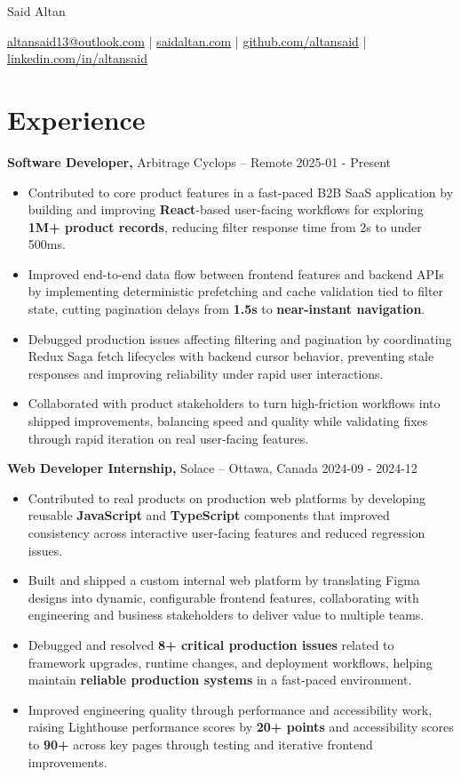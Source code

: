 \documentclass[11pt]{article}       %
\newcommand{\resumeSubheading}[4]{
\textbf{#1,} {#3} -- #4 \hfill #2 \\
\vspace{-9pt}
}
\newcommand{\resumeItem}[1]{
  \item #1
}
\begin{document}
\centerline{\Huge Said Altan}

\vspace{10pt}

\centerline{\href{mailto:altansaid13@outlook.com}{altansaid13@outlook.com} | \href{https://saidaltan.com}{saidaltan.com} | \href{https://github.com/altansaid}{github.com/altansaid} | \href{https://www.linkedin.com/in/altansaid}{linkedin.com/in/altansaid}}

\vspace{5pt}
\section*{Experience}
\resumeSubheading{Software Developer}{2025-01 - Present}{Arbitrage Cyclops}{Remote}
\begin{itemize}
  \resumeItem{Contributed to core product features in a fast-paced B2B SaaS application by building and improving \textbf{React}-based user-facing workflows for exploring \textbf{1M+ product records}, reducing filter response time from 2s to under 500ms.}
  \resumeItem{Improved end-to-end data flow between frontend features and backend APIs by implementing deterministic prefetching and cache validation tied to filter state, cutting pagination delays from \textbf{1.5s} to \textbf{near-instant navigation}.}
  \resumeItem{Debugged production issues affecting filtering and pagination by coordinating Redux Saga fetch lifecycles with backend cursor behavior, preventing stale responses and improving reliability under rapid user interactions.}
  \resumeItem{Collaborated with product stakeholders to turn high-friction workflows into shipped improvements, balancing speed and quality while validating fixes through rapid iteration on real user-facing features.}
\end{itemize}

\resumeSubheading{Web Developer Internship}{2024-09 - 2024-12}{Solace}{Ottawa, Canada}
\begin{itemize}
  \resumeItem{Contributed to real products on production web platforms by developing reusable \textbf{JavaScript} and \textbf{TypeScript} components that improved consistency across interactive user-facing features and reduced regression issues.}
  \resumeItem{Built and shipped a custom internal web platform by translating Figma designs into dynamic, configurable frontend features, collaborating with engineering and business stakeholders to deliver value to multiple teams.}
  \resumeItem{Debugged and resolved \textbf{8+ critical production issues} related to framework upgrades, runtime changes, and deployment workflows, helping maintain \textbf{reliable production systems} in a fast-paced environment.}
  \resumeItem{Improved engineering quality through performance and accessibility work, raising Lighthouse performance scores by \textbf{20+ points} and accessibility scores to \textbf{90+} across key pages through testing and iterative frontend improvements.}
\end{itemize}
\end{document}
